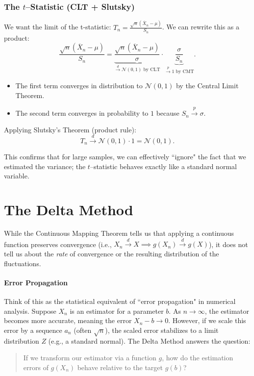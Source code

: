 \begin{ex}
\subsubsection*{The \(t\)--Statistic (CLT + Slutsky)}
We want the limit of the t-statistic: $T_n = \frac{\sqrt{n}(\overline{X}_n - \mu)}{S_n}$.
We can rewrite this as a product:
\[ \frac{\sqrt{n}(\overline{X}_n - \mu)}{S_n} = \underbrace{\frac{\sqrt{n}(\overline{X}_n - \mu)}{\sigma}}_{\xrightarrow{d} \mathcal{N}(0,1) \text{ by CLT}} \cdot \underbrace{\frac{\sigma}{S_n}}_{\xrightarrow{p} 1 \text{ by CMT}}. \]

\begin{itemize}
    \item The first term converges in distribution to $\mathcal{N}(0,1)$ by the Central Limit Theorem.
    \item The second term converges in probability to $1$ because $S_n \xrightarrow{p} \sigma$.
\end{itemize}

Applying Slutsky's Theorem (product rule):
\[ T_n \xrightarrow{d} \mathcal{N}(0, 1) \cdot 1 = \mathcal{N}(0, 1). \]

\begin{note}
This confirms that for large samples, we can effectively ``ignore" the fact that we estimated the variance; the \(t\)--statistic behaves exactly like a standard normal variable.
\end{note}
\end{ex}

\section{The Delta Method}

While the Continuous Mapping Theorem tells us that applying a continuous function preserves convergence (i.e., $X_n \xrightarrow{d} X \implies g(X_n) \xrightarrow{d} g(X)$), it does not tell us about the \textit{rate} of convergence or the resulting distribution of the fluctuations.

\paragraph{Error Propagation}%
\label{par:Error Propagation}

Think of this as the statistical equivalent of ``error propagation" in numerical analysis.
Suppose $X_n$ is an estimator for a parameter $b$. As $n \to \infty$, the estimator becomes more accurate, meaning the error $X_n - b \to 0$. However, if we scale this error by a sequence $a_n$ (often $\sqrt{n}$), the scaled error stabilizes to a limit distribution $Z$ (e.g., a standard normal).
The Delta Method answers the question: 
\begin{quote}
If we transform our estimator via a function $g$, how do the estimation errors of $g(X_n)$ behave relative to the target $g(b)$?
\end{quote}

